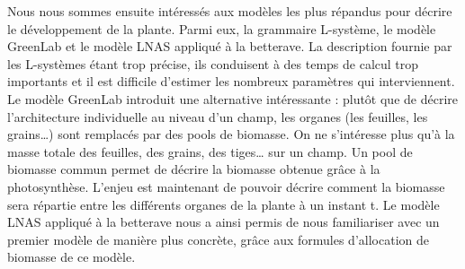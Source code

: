 Nous nous sommes ensuite intéressés aux modèles les plus répandus pour décrire le développement de la plante. Parmi eux, la grammaire L-système, le modèle GreenLab et le modèle LNAS appliqué à la betterave. La description fournie par les L-systèmes étant trop précise, ils conduisent à des temps de calcul trop importants et il est difficile d’estimer les nombreux paramètres qui interviennent.
Le modèle GreenLab introduit une alternative intéressante : plutôt que de décrire l’architecture individuelle au niveau d’un champ, les organes (les feuilles, les grains…) sont remplacés par des pools de biomasse. On ne s’intéresse plus qu’à la masse totale des feuilles, des grains, des tiges… sur un champ. Un pool de biomasse commun permet de décrire la biomasse obtenue grâce à la photosynthèse. L’enjeu est maintenant de pouvoir décrire comment la biomasse sera répartie entre les différents organes de la plante à un instant t. Le modèle LNAS appliqué à la betterave nous a ainsi permis de nous familiariser avec un premier modèle de manière plus concrète, grâce aux formules d’allocation de biomasse de ce modèle.
